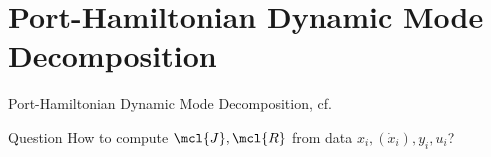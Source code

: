 \section{Port-Hamiltonian Dynamic Mode Decomposition}

\begin{frame}{Port-Hamiltonian Dynamic Mode Decomposition, cf.~\cite{Morandin2022}}
    \begin{alertblock}{Question}
        How to compute $\mcl{J}, \mcl{R}$ from data $x_i, (\dot{x}_i), y_i, u_i$?
    \end{alertblock}



\end{frame}

